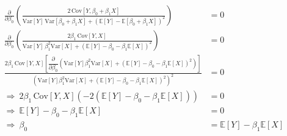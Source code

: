 \documentclass{article}
\begin{document}
\begin{itemize}
    \begin{align*}
        \frac{\partial}{\partial \beta_0}\left(\frac{2\,\text{Cov}[Y,\beta_0+\beta_1 X]}{\text{Var}[Y]\,\text{Var}[\beta_0+\beta_1 X] + \left(\mathbb{\text{E}}[Y]-\mathbb{\text{E}}[\beta_0+\beta_1 X]\right)^2}\right) &= 0 \\[6pt]
        \frac{\partial}{\partial \beta_0}\left(\frac{2\beta_1\,\text{Cov}[Y,X]}{\text{Var}[Y]\,\beta_1^2\text{Var}[X] + \left(\mathbb{\text{E}}[Y]-\beta_0-\beta_1\mathbb{\text{E}}[X]\right)^2}\right) &= 0 \\[6pt]
        \frac{2\beta_1\,\text{Cov}[Y,X]\left[\dfrac{\partial}{\partial \beta_0}\left(\text{Var}[Y]\beta_1^2\text{Var}[X] + \left(\mathbb{\text{E}}[Y]-\beta_0-\beta_1\mathbb{\text{E}}[X]\right)^2\right)\right]}{\left(\text{Var}[Y]\beta_1^2\text{Var}[X] + \left(\mathbb{\text{E}}[Y]-\beta_0-\beta_1\mathbb{\text{E}}[X]\right)^2\right)^2} &= 0 \\[10pt]
        \Rightarrow\ 2\beta_1\,\text{Cov}[Y,X]\left(-2\left(\mathbb{\text{E}}[Y]-\beta_0-\beta_1\mathbb{\text{E}}[X]\right)\right) &= 0 \\
        \Rightarrow\ \mathbb{\text{E}}[Y] - \beta_0 - \beta_1\mathbb{\text{E}}[X] &= 0 \\
        \Rightarrow\ \beta_0 &= \mathbb{\text{E}}[Y] - \beta_1\mathbb{\text{E}}[X]
    \end{align*}
    

\end{itemize}
\end{document}
